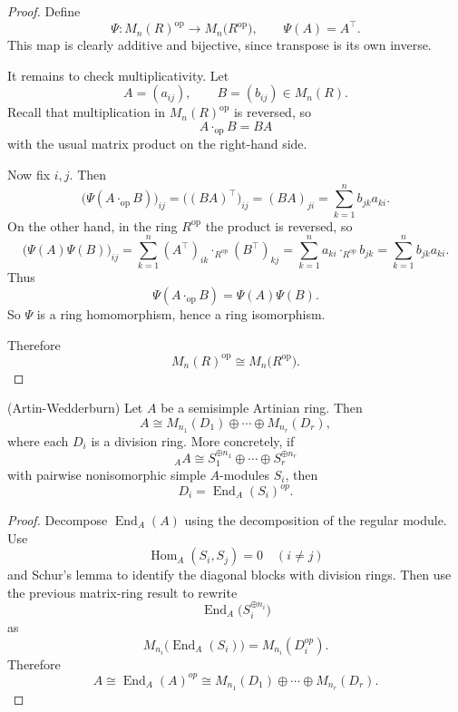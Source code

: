 \begin{proof}
    Define
    \[
        \Psi:M_n(R)^{\operatorname{op}}\longrightarrow M_n\bigl(R^{\operatorname{op}}\bigr),
        \qquad
        \Psi(A)=A^{\top}.
    \]
    This map is clearly additive and bijective, since transpose is its own inverse.

    It remains to check multiplicativity. Let
    \[
        A=(a_{ij}),\qquad B=(b_{ij})\in M_n(R).
    \]
    Recall that multiplication in $M_n(R)^{\operatorname{op}}$ is reversed, so
    \[
        A\cdot_{\operatorname{op}} B = BA
    \]
    with the usual matrix product on the right-hand side.

    Now fix $i,j$. Then
    \[
        \bigl(\Psi(A\cdot_{\operatorname{op}} B)\bigr)_{ij}
        =\bigl((BA)^{\top}\bigr)_{ij}
        =(BA)_{ji}
        =\sum_{k=1}^n b_{jk}a_{ki}.
    \]
    On the other hand, in the ring $R^{\operatorname{op}}$ the product is reversed, so
    \[
        \bigl(\Psi(A)\Psi(B)\bigr)_{ij}
        =\sum_{k=1}^n (A^{\top})_{ik}\cdot_{R^{\operatorname{op}}}(B^{\top})_{kj}
        =\sum_{k=1}^n a_{ki}\cdot_{R^{\operatorname{op}}} b_{jk}
        =\sum_{k=1}^n b_{jk}a_{ki}.
    \]
    Thus
    \[
        \Psi(A\cdot_{\operatorname{op}} B)=\Psi(A)\Psi(B).
    \]
    So $\Psi$ is a ring homomorphism, hence a ring isomorphism.

    Therefore
    \[
        M_n(R)^{\operatorname{op}}\cong M_n\bigl(R^{\operatorname{op}}\bigr).
    \]
\end{proof}

\begin{theorem}
    (Artin-Wedderburn) Let $A$ be a semisimple Artinian ring.
    Then
    \[
        A \cong M_{n_1}(D_1) \oplus \cdots \oplus M_{n_r}(D_r),
    \]
    where each $D_i$ is a division ring.
    More concretely, if
    \[
        {}_A A \cong S_1^{\oplus n_1} \oplus \cdots \oplus S_r^{\oplus n_r}
    \]
    with pairwise nonisomorphic simple $A$-modules $S_i$, then
    \[
        D_i = \operatorname{End}_A(S_i)^{op}.
    \]
\end{theorem}

\begin{proof}
    Decompose $\operatorname{End}_A(A)$ using the decomposition of the regular module.
    Use
    \[
        \operatorname{Hom}_A(S_i,S_j)=0
        \quad (i \neq j)
    \]
    and Schur's lemma to identify the diagonal blocks with division rings.
    Then use the previous matrix-ring result to rewrite
    \[
        \operatorname{End}_A\bigl(S_i^{\oplus n_i}\bigr)
    \]
    as
    \[
        M_{n_i}\bigl(\operatorname{End}_A(S_i)\bigr)=M_{n_i}(D_i^{op}).
    \]
    Therefore
    \[
        A \cong \operatorname{End}_A(A)^{op} \cong M_{n_1}(D_1) \oplus \cdots \oplus M_{n_r}(D_r).
    \]
\end{proof}




